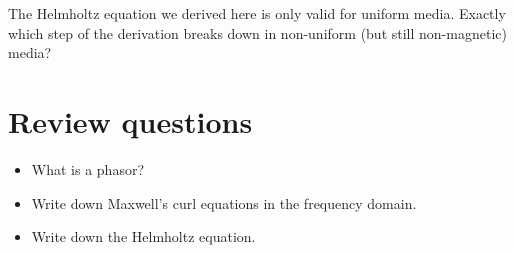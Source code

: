 \begin{exer}
The Helmholtz equation we derived here is only valid for uniform media. Exactly which step of the derivation breaks down in non-uniform (but still non-magnetic) media?
\end{exer}

\section*{Review questions}

\begin{itemize}
\item What is a phasor?
\item Write down Maxwell's curl equations in the frequency domain.
\item Write down the Helmholtz equation.
\end{itemize}



